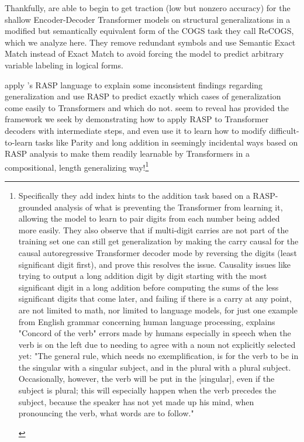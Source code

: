 \documentclass[11pt]{article}
\begin{document}
Thankfully, \cite{Wu2023} are able to begin to get traction (low but nonzero accuracy) for the shallow Encoder-Decoder Transformer models on structural generalizations in a modified but semantically equivalent form of the COGS task they call ReCOGS, which we analyze here. They remove redundant symbols and use Semantic Exact Match instead of Exact Match to avoid forcing the model to predict arbitrary variable labeling in logical forms.


\cite{Zhou2024} apply \cite{Weiss2021}'s RASP language to explain some inconsistent findings regarding generalization and use RASP to predict exactly which cases of generalization come easily to Transformers and which do not. \cite{Zhou2024} seem to reveal \cite{Weiss2021} has provided the framework we seek by demonstrating how to apply RASP to Transformer decoders with intermediate steps, and even use it to learn how to modify difficult-to-learn tasks like Parity and long addition in seemingly incidental ways based on RASP analysis to make them readily learnable by Transformers in a compositional, length generalizing way!\footnote{\begin{tiny}Specifically they add index hints to the addition task based on a RASP-grounded analysis of what is preventing the Transformer from learning it, allowing the model to learn to pair digits from each number being added more easily. They also observe that if multi-digit carries are not part of the training set one can still get generalization by making the carry causal for the causal autoregressive Transformer decoder mode by reversing the digits (least significant digit first), and prove this resolves the issue. Causality issues like trying to output a long addition digit by digit starting with the most significant digit in a long addition before computing the sums of the less significant digits that come later, and failing if there is a carry at any point, are not limited to math, nor limited to language models, for just one example from English grammar concerning human language processing, \cite{jespersen1913modernenglishgrammar1954reprint} explains "Concord of the verb" errors made by humans especially in speech when the verb is on the left due to needing to agree with a noun not explicitly selected yet: "The general rule, which needs no exemplification, is for the verb to be in the singular with a singular subject, and in the plural with a plural subject. Occasionally, however, the verb will be put in the [singular], even if the subject is plural; this will especially happen when the verb precedes the subject, because the speaker has not yet made up his mind, when pronouncing the verb, what words are to follow."\end{tiny}}
\end{document}
